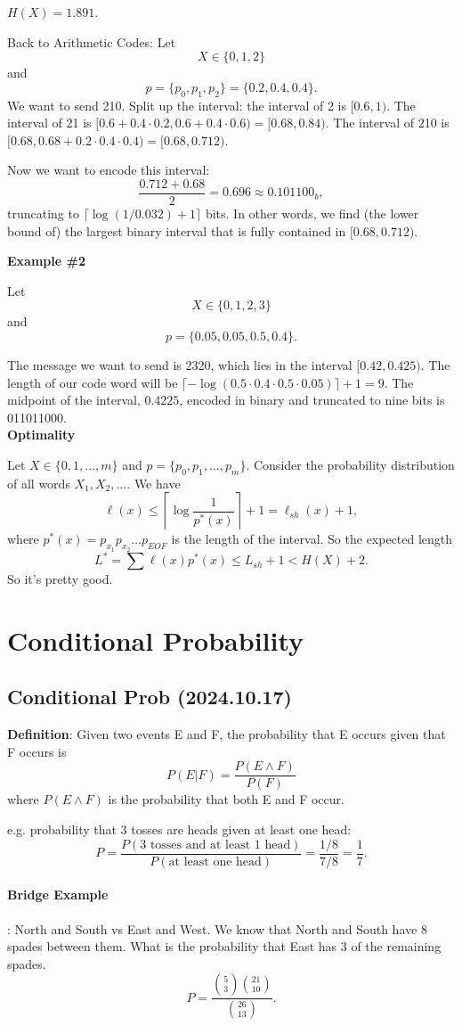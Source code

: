 \documentclass[12pt]{article}
\begin{document}
$H(X)=1.891.$

Back to Arithmetic Codes:
Let
\[X\in\{0,1,2\}\]
and
\[p=\{p_0,p_1,p_2\}=\{0.2,0.4,0.4\}.\]
We want to send 210. Split up the interval: the interval of 2 is $[0.6,1).$ The interval of 21 is $[0.6+0.4\cdot 0.2,0.6+0.4\cdot 0.6)=[0.68,0.84).$ The interval of 210 is $[0.68,0.68+0.2\cdot0.4\cdot0.4)=[0.68,0.712).$

Now we want to encode this interval:
\[\frac{0.712+0.68}{2}=0.696\approx 0.101100_b,\] truncating to $\lceil\log(1/0.032)+1\rceil$ bits. In other words, we find (the lower bound of) the largest binary interval that is fully contained in $[0.68,0.712).$

\textbf{Example \#2}

Let
\[X\in\{0,1,2, 3\}\]
and
\[p=\{0.05,0.05,0.5, 0.4\}.\]

The message we want to send is 2320, which lies in the interval $[0.42, 0.425)$. The length of our code word will be $\lceil -\log(0.5 \cdot 0.4 \cdot 0.5 \cdot 0.05) \rceil + 1 = 9$. The midpoint of the interval, $0.4225$, encoded in binary and truncated to nine bits is 011011000. \\

\textbf{Optimality}

Let
$X\in\{0,1, ..., m\}$
and
$p=\{p_0,p_1, ..., p_m\}$.
Consider the probability distribution of all words $X_1,X_2,\dots.$
We have
\[\ell(x)\le\left\lceil \log
\frac{1}{p^\ast(x)}\right\rceil+1=\ell_{sh}(x)+1,\]
where $p^{\ast}(x)=p_{x_1}p_{x_2}\dots p_{EOF}$ is the length of the interval.
So the expected length
\[L^{\ast}=\sum \ell(x)p^{\ast}(x)\le L_{sh}+1<H(X)+2.\] So it's pretty good.


\section{Conditional Probability}
\subsection{Conditional Prob (2024.10.17)}
\textbf{Definition}: Given two events E and F, the probability that E occurs given that F occurs is
\[P(E|F)=\frac{P(E\wedge F)}{P(F)}\]
where $P(E\wedge F)$ is the probability that both E and F occur.

e.g. probability that 3 tosses are heads given at least one head:
\[P=\frac{P(\text{3 tosses and at least 1 head})}{P(\text{at least one head})}=\frac{1/8}{7/8}=\frac{1}{7}.\]

\paragraph{Bridge Example}:
North and South vs East and West. We know that North and South have 8 spades between them. What is the probability that East has 3 of the remaining spades.
\[P=\frac{\binom{5}{3}\binom{21}{10}}{\binom{26}{13}}.\]
\end{document}
